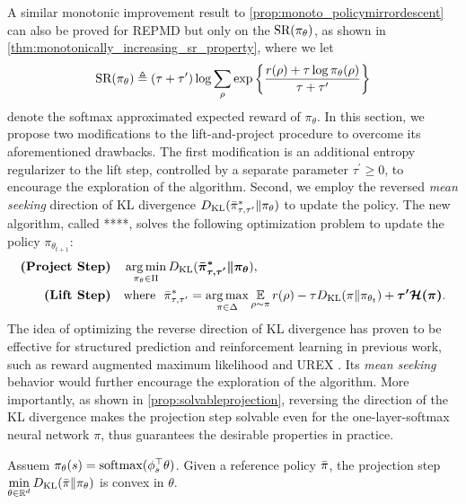 A similar monotonic improvement result to \cref{prop:monoto_policymirrordescent} can also be proved for REPMD but only on the $\text{SR}(\pi_\theta) $, as shown in \cref{thm:monotonically_increasing_sr_property}, where we let
\begin{equation*}
\text{SR}(\pi_\theta) \triangleq (\tau + \tau^{\prime})\log{ \sum_{\rho}{ \exp\left\{ \frac{r(\rho) + \tau \log{\pi_\theta(\rho)} }{\tau + \tau^{\prime}} \right\} }}
\end{equation*}
denote the softmax approximated expected reward of $\pi_\theta$.
\fi
In this section, we propose two modifications to the lift-and-project procedure to overcome its aforementioned drawbacks.
The first modification is an additional entropy regularizer to the lift step, controlled by a separate parameter $\tau^{\prime}\geq 0$, to encourage the exploration of the algorithm. 
Second, we employ the reversed \emph{mean seeking} direction of KL divergence $D_{\mathrm{KL}}(\bar{\pi}_{\tau,\tau^{\prime}}^* \| \pi_\theta)$ to update the policy.
The new algorithm, called ****, solves the following optimization problem to update the policy $\pi_{\theta_{t+1}}$:
\begin{equation}
\label{eq:repmd}
\begin{split}
\text{\bf (Project Step)} \quad  &\argmin\limits_{\pi_\theta \in \Pi}{\KL(\bm{ \bar{\pi}_{\tau,\tau^{\prime}}^* \| \pi_\theta }) }, \\
\text{\bf (Lift Step)} \quad  & \text{where}\ \ \bar{\pi}_{\tau,\tau^{\prime}}^*  =  \argmax\limits_{\pi \in \Delta}{ \ep\limits_{\rho \sim \pi}{  r(\rho)  - \tau \KL(\pi \| \pi_{\theta_t}) + \bm{\tau^{\prime} \cH(\pi)} }}.
\end{split}
\end{equation}
The idea of optimizing the reverse direction of KL divergence has proven to be effective for structured prediction and reinforcement learning in previous work, such as reward augmented maximum likelihood \citep{norouzi2016reward} and UREX \citep{nachum2017improving}.
Its \emph{mean seeking} behavior would further encourage the exploration of the algorithm.
More importantly, as shown in \cref{prop:solvableprojection}, reversing the direction of the KL divergence makes the projection step solvable even for the one-layer-softmax neural network $\pi$, thus guarantees the desirable properties in practice.
\begin{prop}
	\label{prop:solvableprojection}
	Assuem $\pi_\theta(s) = \mathrm{softmax}(\phi_s^{\top}\theta)$. Given a reference policy $\bar{\pi}$, the projection step $\min\limits_{\theta \in \mathbb{R}^d}{D_{\mathrm{KL}}(\bar{\pi} \| \pi_\theta)}$ is convex in $\theta$.
\end{prop}

